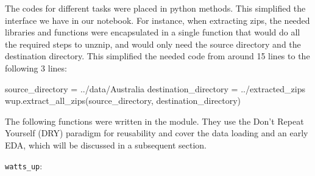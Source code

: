 \documentclass[mstat,12pt]{unswthesis}
\newenvironment{Shaded}{}{}
\newcommand{\NormalTok}[1]{#1}
\newcommand{\OperatorTok}[1]{\textcolor[rgb]{0.40,0.40,0.40}{#1}}
\newcommand{\StringTok}[1]{\textcolor[rgb]{0.25,0.44,0.63}{#1}}
\begin{document}
The codes for different tasks were placed in python methods. This
simplified the interface we have in our notebook. For instance, when
extracting zips, the needed libraries and functions were encapsulated in
a single function that would do all the required steps to unznip, and
would only need the source directory and the destination directory. This
simplified the needed code from around 15 lines to the following 3
lines:

\begin{Shaded}
\begin{Highlighting}[]
\NormalTok{source\_directory }\OperatorTok{=} \StringTok{\textquotesingle{}../data/Australia\textquotesingle{}}
\NormalTok{destination\_directory }\OperatorTok{=} \StringTok{\textquotesingle{}../extracted\_zips\textquotesingle{}}
\NormalTok{wup.extract\_all\_zips(source\_directory, destination\_directory)}
\end{Highlighting}
\end{Shaded}

The following functions were written in the module. They use the Don't
Repeat Yourself (DRY) paradigm for reusability and cover the data
loading and an early EDA, which will be discussed in a subsequent
section.

\texttt{watts\_up}:
\end{document}
